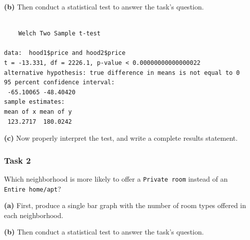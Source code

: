 \documentclass[
]{book}
\newenvironment{Shaded}{\begin{snugshade}}{\end{snugshade}}
\newcommand{\KeywordTok}[1]{\textcolor[rgb]{0.13,0.29,0.53}{\textbf{#1}}}
\newcommand{\NormalTok}[1]{#1}
\newcommand{\OperatorTok}[1]{\textcolor[rgb]{0.81,0.36,0.00}{\textbf{#1}}}
\begin{document}
\textbf{(b)} Then conduct a statistical test to answer the task's question.

\begin{Shaded}
\end{Shaded}

\begin{verbatim}

    Welch Two Sample t-test

data:  hood1$price and hood2$price
t = -13.331, df = 2226.1, p-value < 0.00000000000000022
alternative hypothesis: true difference in means is not equal to 0
95 percent confidence interval:
 -65.10065 -48.40420
sample estimates:
mean of x mean of y 
 123.2717  180.0242 
\end{verbatim}

\textbf{(c)} Now properly interpret the test, and write a complete results statement.

\hypertarget{task-2-1}{%
\subsubsection*{Task 2}\label{task-2-1}}

Which neighborhood is more likely to offer a \texttt{Private\ room} instead of an \texttt{Entire\ home/apt}?

\textbf{(a)} First, produce a single bar graph with the number of room types offered in each neighborhood.

\textbf{(b)} Then conduct a statistical test to answer the task's question.
\end{document}
